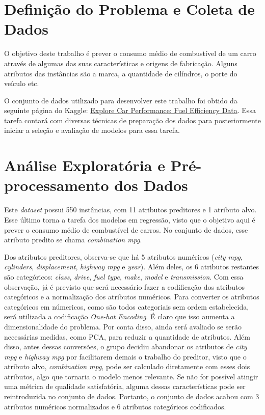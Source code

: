 \documentclass{report}
\let\oldsection\section
\renewcommand\section{\clearpage\oldsection}
\begin{document}
\section{Definição do Problema e Coleta de Dados}

O objetivo deste trabalho é prever o consumo médio de combustível de um carro através de algumas das suas características e origens de fabricação.
Alguns atributos das instâncias são a marca, a quantidade de cilíndros, o porte do veículo etc.

O conjunto de dados utilizado para desenvolver este trabalho foi obtido da seguinte página do Kaggle:
\href{https://www.kaggle.com/datasets/arslaan5/explore-car-performance-fuel-efficiency-data}{Explore Car Performance: Fuel Efficiency Data}.
Essa tarefa contará com diversas técnicas de preparação dos dados para posteriormente iniciar a seleção e
avaliação de modelos para essa tarefa.

\section{Análise Exploratória e Pré-processamento dos Dados}

Este \textit{dataset} possui 550 instâncias, com 11 atributos preditores e 1 atributo alvo. Esse último torna a tarefa dos modelos em regressão,
visto que o objetivo aqui é prever o consumo médio de combustível de carros. No conjunto de dados, esse atributo predito se chama \textit{combination mpg}.

Dos atributos preditores, observa-se que há 5 atributos numéricos (\textit{city mpg}, \textit{cylinders}, \textit{displacement}, \textit{highway mpg} e \textit{year}).
Além deles, os 6 atributos restantes são categóricos: \textit{class}, \textit{drive}, \textit{fuel type}, \textit{make}, \textit{model} e \textit{transmission}.
Com essa observação, já é previsto que será necessário fazer a codificação dos atributos categóricos e a normalização dos atributos numéricos. Para converter os atributos
categóricos em númericos, como são todos categoriais sem ordem estabelecida, será utilizada a codificação \textit{One-hot Encoding}. É claro que isso aumenta a dimensionalidade
do problema. Por conta disso, ainda será avaliado se serão necessárias medidas, como PCA, para reduzir a quantidade de atributos. Além disso, antes dessas conversões, o grupo
decidiu abandonar os atributos de \textit{city mpg} e \textit{highway mpg} por facilitarem demais o trabalho do preditor, visto que o atributo alvo, \textit{combination mpg},
pode ser calculado diretamente com esses dois atributos, algo que tornaria o modelo menos relevante. Se não for possível atingir uma métrica de qualidade satisfatória, alguma
dessas características pode ser reintroduzida no conjunto de dados. Portanto, o conjunto de dados acabou com 3 atributos numéricos normalizados e 6 atributos categóricos codificados.
\end{document}
